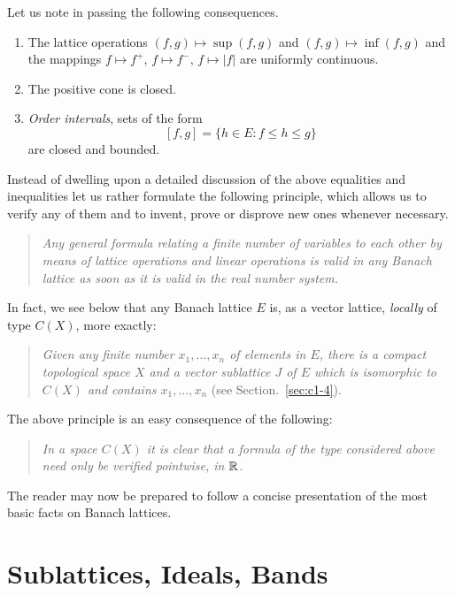 Let us note in passing the following consequences.
%
\begin{enumerate}[\upshape (i)]
\item 
The lattice operations $ (f,g) \mapsto \sup(f,g) $ and $ (f,g) \mapsto \inf(f,g) $ and the mappings $ f \mapsto f^{+} $, $ f \mapsto f^{-} $, $ f \mapsto |f| $ are uniformly continuous.

\item 
The positive cone is closed.

\item 
\emph{Order intervals}, \ie sets of the form
\[
	\left[ f,g \right] = \{ h \in E \colon f \leq h \leq g \}
\]
are closed and bounded.
\end{enumerate}
Instead of dwelling upon a detailed discussion of the above equalities and inequalities let us rather formulate the following principle, which allows us to verify any of them and to invent, prove or disprove new ones whenever necessary.
\begin{quote}
\textit{Any general formula relating a finite number of \emph{variables} to each other by means of lattice operations and linear operations is valid in any Banach lattice as soon as it is valid in the real number system.} 
\end{quote}
In fact, we see below that any Banach lattice $ E $ is, as a vector lattice, \emph{locally} of type $ C(X) $, more exactly:
\begin{quote}
\textit{Given any finite number $ x_{1},\ldots, x_{n} $ of elements in $ E $, there is a compact topological space $ X $ and a vector sublattice $ J $ of\/ $ E $ which is isomorphic to $ C(X) $ and contains $ x_{1},\ldots,x_{n} $} (see Section.~\ref{sec:c1-4}).
\end{quote}
The above principle is an easy consequence of the following:
\begin{quote}
\textit{In a space $ C(X) $ it is clear that a formula of the type considered above need only be verified pointwise, \ie  in $ \mathbb{R} $.}
\end{quote}
The reader may now be prepared to follow a concise presentation of the most basic facts on Banach lattices.
\section{Sublattices, Ideals, Bands}\label{sec:c1-1}%
%
%

